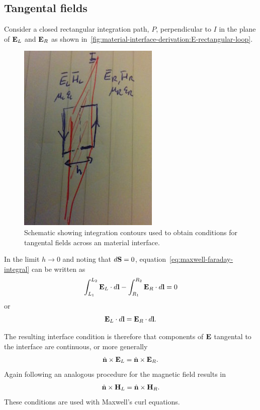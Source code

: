 \subsection{Tangental fields}

Consider a closed rectangular integration path, $P$, perpendicular to $I$ in the plane of $\mathbf{E}_L$ and $\mathbf{E}_R$ as shown in~\eqref{fig:material-interface-derivation:E-rectangular-loop}.
\begin{figure}[htbp!]
  \begin{center}
    \includegraphics[height=0.3\textheight]{Figures/Chapters/PhysicalProblem/interfaceContour}
  \end{center}
  \caption{Schematic showing integration contours used to obtain conditions for
    tangental fields across an material interface.}
  \label{fig:material-interface-derivation:E-rectangular-loop}
\end{figure}
In the limit $h \to 0$ and noting that $d\mathbf{S} = 0$, equation~\eqref{eq:maxwell-faraday-integral} can be written as
\begin{equation}
  \label{eq:material-interfaces-tangentalcondition-E}
  \int_{L_1}^{L_2} \mathbf{E}_L \cdot d\mathbf{l} - \int_{R_1}^{R_2} \mathbf{E}_R \cdot d \mathbf{l} = 0
\end{equation}
or
$$
\mathbf{E}_L \cdot d\mathbf{l} = \mathbf{E}_R \cdot d \mathbf{l} .
$$

The resulting interface condition is therefore that components of $\mathbf{E}$ tangental to the interface are continuous, or more generally
$$
\hat{\mathbf{n}} \times \mathbf{E}_L = \hat{\mathbf{n}} \times \mathbf{E}_R .
$$
Again following an analogous procedure for the magnetic field results in
$$
\hat{\mathbf{n}} \times \mathbf{H}_L = \hat{\mathbf{n}} \times \mathbf{H}_R .
$$
These conditions are used with Maxwell's curl equations.

